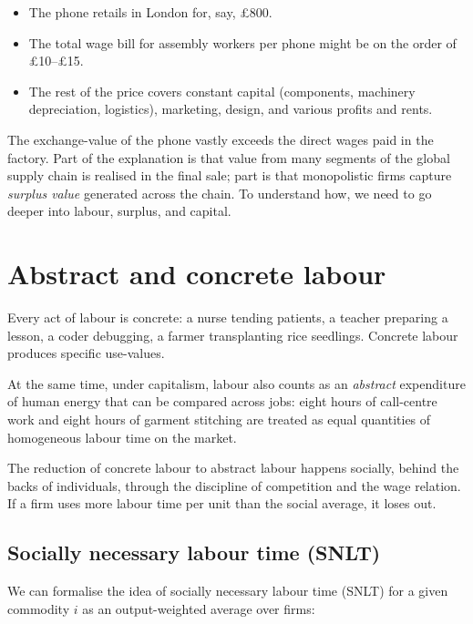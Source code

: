 \begin{itemize}[leftmargin=1.5em]
  \item The phone retails in London for, say, \pounds800.
  \item The total wage bill for assembly workers per phone might be on the
  order of \pounds10--\pounds15.
  \item The rest of the price covers constant capital (components, machinery
  depreciation, logistics), marketing, design, and various profits and rents.
\end{itemize}

The exchange-value of the phone vastly exceeds the direct wages paid in the
factory. Part of the explanation is that value from many segments of the
global supply chain is realised in the final sale; part is that monopolistic
firms capture \emph{surplus value} generated across the chain. To understand
how, we need to go deeper into labour, surplus, and capital.

\section{Abstract and concrete labour}
\label{sec:abstract-concrete}

Every act of labour is concrete: a nurse tending patients, a teacher
preparing a lesson, a coder debugging, a farmer transplanting rice seedlings.
Concrete labour produces specific use-values.

At the same time, under capitalism, labour also counts as an \emph{abstract}
expenditure of human energy that can be compared across jobs: eight hours of
call-centre work and eight hours of garment stitching are treated as equal
quantities of homogeneous labour time on the market.

The reduction of concrete labour to abstract labour happens socially, behind
the backs of individuals, through the discipline of competition and the
wage relation. If a firm uses more labour time per unit than the social
average, it loses out.

\subsection{Socially necessary labour time (SNLT)}
\label{sec:snlt}

We can formalise the idea of socially necessary labour time (SNLT) for a given
commodity $i$ as an output-weighted average over firms:

